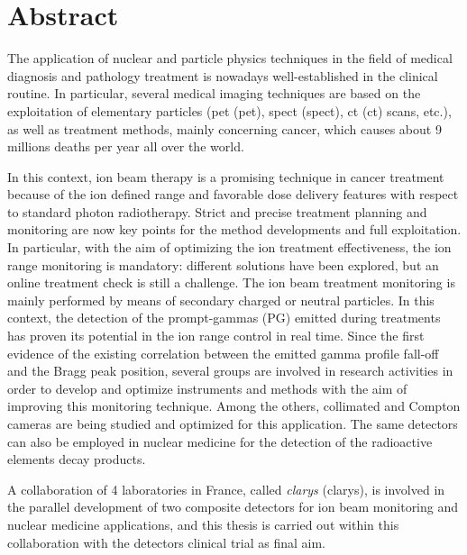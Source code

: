 \chapter*{Abstract}

\glsresetall


The application of nuclear and particle physics techniques in the field of medical diagnosis and pathology treatment is nowadays well-established in the clinical routine. In particular, several medical imaging techniques are based on the exploitation of elementary particles (\glsdesc{pet} (\gls{pet}), \glsdesc{spect} (\gls{spect}), \glsdesc{ct} (\gls{ct}) scans,  etc.), as well as treatment methods, mainly concerning cancer, which causes about 9 millions deaths per year all over the world.
     
In this context, ion beam therapy is a promising technique in cancer treatment because of the ion defined range and favorable dose delivery features with respect to standard photon radiotherapy. Strict and precise treatment planning and monitoring are now key points for the method developments and full exploitation. In particular, with the aim of optimizing the ion treatment effectiveness, the ion range monitoring is mandatory: different solutions have been explored, but an online treatment check is still a challenge. 
The ion beam treatment monitoring is mainly performed by means of secondary charged or neutral particles. In this context, the detection of the prompt-gammas (PG) emitted during treatments has proven its potential in the ion range control in real time. Since the first evidence of the existing correlation between the emitted gamma profile fall-off and the Bragg peak position, several groups are involved in research activities in order to develop and optimize instruments and methods with the aim of improving this monitoring technique.  Among the others, collimated and Compton cameras are being studied and optimized for this application. The same detectors can also be employed in nuclear medicine for the detection of the radioactive elements decay products.      

A collaboration of 4 laboratories in France, called \textit{\glsdesc{clarys}} (\gls{clarys}), is involved in the parallel development of two composite detectors for ion beam monitoring and nuclear medicine applications, and this thesis is carried out within this collaboration with the detectors clinical trial as final aim.


